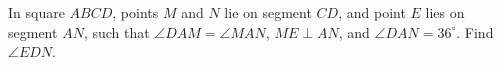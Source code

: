In square $ABCD$, points $M$ and $N$ lie on segment $CD$, and point $E$ lies on segment $AN$, such that $\angle DAM=\angle MAN$, $ME \perp AN$, and $\angle DAN=36^{\circ}$. Find $\angle EDN$.

